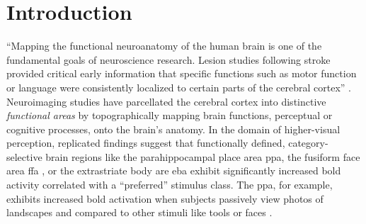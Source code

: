 





\section{Introduction}


``Mapping the functional neuroanatomy of the human brain is one of the
fundamental goals of neuroscience research. Lesion studies following stroke
provided critical early information that specific functions such as motor
function or language were consistently localized to certain parts of the
cerebral cortex'' \citep{satterthwaite2015towards}.
%
Neuroimaging studies have parcellated the cerebral cortex into distinctive
\textit{functional areas} by topographically mapping brain functions, perceptual
or cognitive processes, onto the brain's anatomy.
In the domain of higher-visual perception, replicated findings suggest that
functionally defined, category-selective brain regions like the parahippocampal
place area \ac{ppa}\citep{epstein1998ppa}, the fusiform face area \ac{ffa}
\citep{kanwisher1997ffa}, or the extrastriate body are \ac{eba}
\citep{downing2001bodyarea} exhibit significantly increased \ac{bold} activity
correlated with a ``preferred'' stimulus class.
The \ac{ppa}, for example, exhibits increased \ac{bold} activation when subjects
passively view photos of landscapes and compared to other stimuli like tools or
faces \citep{aguirre1998area, epstein1998ppa}.


